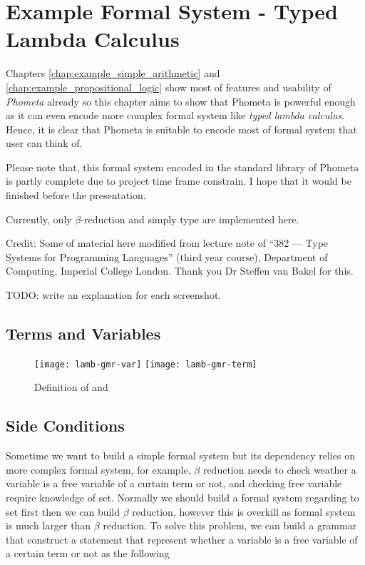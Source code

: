 \documentclass[master.tex]{subfiles}
\begin{document}
\chapter{Example Formal System - Typed Lambda Calculus}
\label{chap:example_lambda_calculus}

Chapters \ref{chap:example_simple_arithmetic} and
\ref{chap:example_propositional_logic} show most of features and usability of
\emph{Phometa} already so this chapter aims to show that Phometa is powerful
enough as it can even encode more complex formal system like \emph{typed lambda
  calculus}. Hence, it is clear that Phometa is suitable to encode most of
formal system that user can think of.

Please note that, this formal system encoded in the standard library of Phometa
is partly complete due to project time frame constrain. I hope that it would be
finished before the presentation.

Currently, only $\beta$-reduction and simply type are implemented here.

Credit: Some of material here modified from lecture note of ``382 --- Type
Systems for Programming Languages'' (third year course), Department of
Computing, Imperial College London. Thank you Dr Steffen van Bakel for this.

TODO: write an explanation for each screenshot.

\section{Terms and Variables}

\begin{figure}[H]
    \centering
\begin{minipage}{0.7\textwidth}
    \texttt{[image: lamb-gmr-var]}
    \texttt{[image: lamb-gmr-term]}
\end{minipage}
\caption{Definition of  and }
\end{figure}
\section{Side Conditions}
Sometime we want to build a simple formal system but its dependency relies on
more complex formal system, for example, $\beta$ reduction needs to check
weather a variable is a free variable of a curtain term or not, and checking
free variable require knowledge of set. Normally we should build a formal system
regarding to set first then we can build $\beta$ reduction, however this is
overkill as formal system is much larger than $\beta$ reduction. To solve this
problem, we can build a grammar that construct a statement that represent
whether a variable is a free variable of a certain term or not as the following
\end{document}
